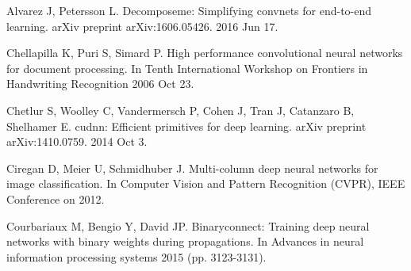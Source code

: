 \documentclass[conference,compsoc]{IEEEtran}
\begin{document}
%
%
%
\begin{thebibliography}{99}




\bibitem{}
Alvarez J, Petersson L. Decomposeme: Simplifying convnets for end-to-end learning. arXiv preprint arXiv:1606.05426. 2016 Jun 17.
\label{refDecompose}

\bibitem{}
Chellapilla K, Puri S, Simard P. High performance convolutional neural networks for document processing. In Tenth International Workshop on Frontiers in Handwriting Recognition 2006 Oct 23.
 \label{refGEMMConv}
 
\bibitem{}
Chetlur S, Woolley C, Vandermersch P, Cohen J, Tran J, Catanzaro B, Shelhamer E. cudnn: Efficient primitives for deep learning. arXiv preprint arXiv:1410.0759. 2014 Oct 3.
\label{refCUDNN}

\bibitem{}
Ciregan D, Meier U, Schmidhuber J. Multi-column deep neural networks for image classification. In Computer Vision and Pattern Recognition (CVPR), IEEE Conference on 2012.
\label{augmentimage1}

\bibitem{}
Courbariaux M, Bengio Y, David JP. Binaryconnect: Training deep neural networks with binary weights during propagations. In Advances in neural information processing systems 2015 (pp. 3123-3131).
\label{refBinNet2}



\end{thebibliography}
\end{document}
